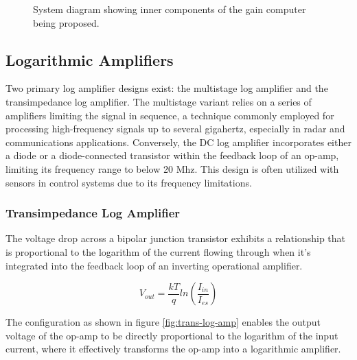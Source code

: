 \documentclass[10pt]{article}
\begin{document}
\begin{multicols*}{2}
\begin{figure}[!t]
{\begin{tikzpicture}
                
                                        \end{tikzpicture}%
                                    }
                
                                    \caption{System diagram showing inner components of the gain computer being proposed.}
                                    \label{fig:gain-comp-diagram}
                
                                \end{figure}
                
            \subsection{Logarithmic Amplifiers} \label{sect:log-amp}
                Two primary log amplifier designs exist: the multistage log amplifier and the transimpedance log amplifier. The multistage variant relies on a series of amplifiers limiting the signal in sequence, a technique commonly employed for processing high-frequency signals up to several gigahertz, especially in radar and communications applications. Conversely, the DC log amplifier incorporates either a diode or a diode-connected transistor within the feedback loop of an op-amp, limiting its frequency range to below 20 Mhz. This design is often utilized with sensors in control systems due to its frequency limitations.\par

                \subsubsection{Transimpedance Log Amplifier}
                    The voltage drop across a bipolar junction transistor exhibits a relationship that is proportional to the logarithm of the current flowing through when it's integrated into the feedback loop of an inverting operational amplifier. 
                    
                        \begin{equation}
                            V_{out}=\frac{kT}{q}ln(\frac{I_{in}}{I_{es}})
                        \end{equation}
                    
                    \noindent The configuration as shown in figure \ref{fig:trans-log-amp} enables the output voltage of the op-amp to be directly proportional to the logarithm of the input current, where it effectively transforms the op-amp into a logarithmic amplifier.\par


\end{multicols*}
\end{document}
